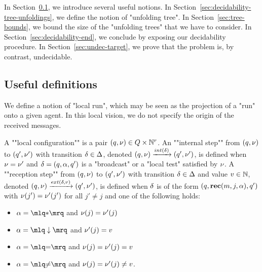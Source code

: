 In Section~\ref{sec:decidability-defs}, we introduce several useful notions. In Section~\ref{sec:decidability-tree-unfoldings}, we define the notion of "unfolding tree". In Section~\ref{sec:tree-bounds}, we bound the size of the "unfolding trees" that we have to consider. In Section~\ref{sec:decidability-end}, we conclude by exposing our decidability procedure. 
In Section~\ref{sec:undec-target}, we prove that the \TARGET problem is, by contrast, undecidable.

\subsection{Useful definitions}
\label{sec:decidability-defs}

We define a notion of "local run", which may be seen as the projection of a "run" onto a given agent. In this local vision, we do not specify the origin of the received messages.
	
\AP A ""local configuration"" is a pair $(q, \nu) \in Q \times \mathbb{N}^r$.  
\AP An ""internal step"" from $(q,\nu)$ to $(q',\nu')$ with transition $\delta \in \Delta$, denoted $(q,\localdata) \intstep{\atrans} (q',\localdata')$, is defined when $\nu = \nu'$ and $\delta =(q, \alpha, q')$ is a "broadcast" or a "local test" satisfied by $\nu$.  
\AP A ""reception step"" from $(q,\nu)$ to $(q',\nu')$ with transition $\delta \in \Delta$ and value $v \in \mathbb{N}$, denoted $(q,\localdata) \extbr{\atrans}{\aval} (q',\localdata')$, is defined when $\delta$ is of the form $(q,\textbf{rec}(m, j, \alpha),q')$ with $\nu(j') = \nu'(j')$ for all $j' \neq j$ and one of the following holds:
	
	\begin{minipage}[t]{6cm}
		\begin{itemize}
			\item $\anact = \quotemarks{\dummyact}$ 
			and $\nu(j) = \nu'(j)$
			\item $\anact = \quotemarks{\enregact}$ and $\nu'(j) = v$
		\end{itemize}
	\end{minipage}
	\begin{minipage}[t]{6cm}
		\begin{itemize}
			\item $\anact = \quotemarks{\eqtestact}$ and $\nu(j) = \nu'(j)= v$
			\item $\anact = \quotemarks{\diseqtestact}$ and $\nu(j) = \nu'(j) \ne v$.
		\end{itemize}
	\end{minipage}
	

